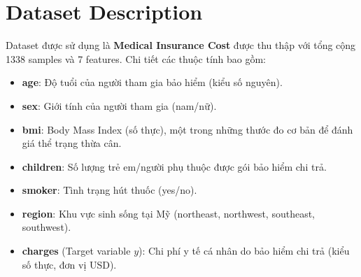 \section{Dataset Description}
Dataset được sử dụng là \textbf{Medical Insurance Cost} được thu thập với tổng cộng 1338 samples và 7 features. Chi tiết các thuộc tính bao gồm:
\begin{itemize}
    \item \textbf{age}: Độ tuổi của người tham gia bảo hiểm (kiểu số nguyên).
    \item \textbf{sex}: Giới tính của người tham gia (nam/nữ).
    \item \textbf{bmi}: Body Mass Index (số thực), một trong những thước đo cơ bản để đánh giá thể trạng thừa cân.
    \item \textbf{children}: Số lượng trẻ em/người phụ thuộc được gói bảo hiểm chi trả.
    \item \textbf{smoker}: Tình trạng hút thuốc (yes/no).
    \item \textbf{region}: Khu vực sinh sống tại Mỹ (northeast, northwest, southeast, southwest).
    \item \textbf{charges} (Target variable $y$): Chi phí y tế cá nhân do bảo hiểm chi trả (kiểu số thực, đơn vị USD).
\end{itemize}
